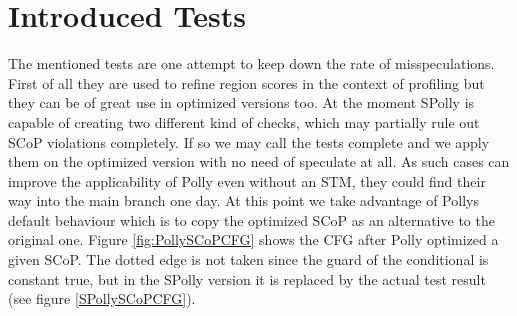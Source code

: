 \section{Introduced Tests}
\label{IntroducedTests}
The mentioned tests are one attempt to keep down the rate of misspeculations. 
First of all they are used to refine region scores in the context of profiling 
but they can be of great use in optimized versions too. At the moment SPolly is
capable of creating two different kind of checks, which may partially rule out
SCoP violations completely. If so we may call the tests complete and we apply 
them on the optimized version with no need of speculate at all. As such cases can 
improve the applicability of Polly even without an STM, they could find their 
way into the main branch one day. At this point we take advantage of Pollys
default behaviour which is to copy the optimized SCoP as an alternative to the
original one. Figure \ref{fig:PollySCoPCFG} shows the CFG after Polly optimized
a given SCoP. The dotted edge is not taken since the guard of the conditional is
constant true, but in the SPolly version it is replaced by the actual test result 
(see figure \ref{SPollySCoPCFG}).

